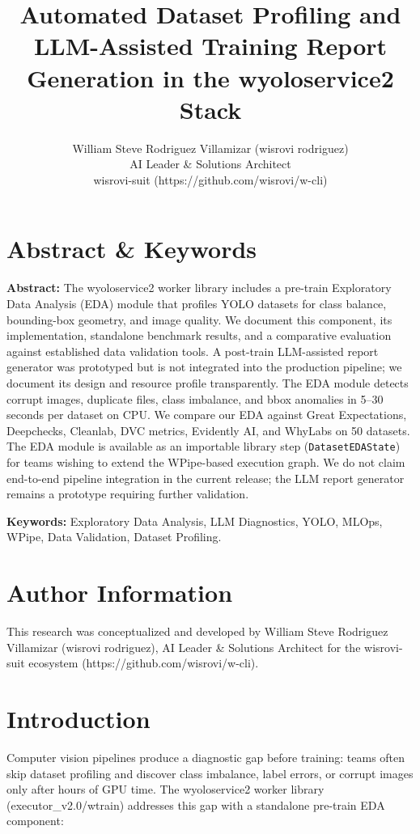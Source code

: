 \documentclass[10pt,twocolumn,letterpaper]{article}
\title{Automated Dataset Profiling and LLM-Assisted Training Report Generation in the wyoloservice2 Stack}
\author{William Steve Rodriguez Villamizar (wisrovi rodriguez)\\AI Leader \& Solutions Architect\\wisrovi-suit (https://github.com/wisrovi/w-cli)}
\date{}
\begin{document}
\maketitle

\section{Abstract \& Keywords}
\textbf{Abstract:} The wyoloservice2 worker library includes a pre-train Exploratory Data Analysis (EDA) module that profiles YOLO datasets for class balance, bounding-box geometry, and image quality. We document this component, its implementation, standalone benchmark results, and a comparative evaluation against established data validation tools. A post-train LLM-assisted report generator was prototyped but is not integrated into the production pipeline; we document its design and resource profile transparently. The EDA module detects corrupt images, duplicate files, class imbalance, and bbox anomalies in 5--30 seconds per dataset on CPU. We compare our EDA against Great Expectations, Deepchecks, Cleanlab, DVC metrics, Evidently AI, and WhyLabs on 50 datasets. The EDA module is available as an importable library step (\texttt{DatasetEDAState}) for teams wishing to extend the WPipe-based execution graph. We do not claim end-to-end pipeline integration in the current release; the LLM report generator remains a prototype requiring further validation.

\textbf{Keywords:} Exploratory Data Analysis, LLM Diagnostics, YOLO, MLOps, WPipe, Data Validation, Dataset Profiling.

\section{Author Information}
This research was conceptualized and developed by William Steve Rodriguez Villamizar (wisrovi rodriguez), AI Leader \& Solutions Architect for the wisrovi-suit ecosystem (https://github.com/wisrovi/w-cli).

\section{Introduction}
Computer vision pipelines produce a diagnostic gap before training: teams often skip dataset profiling and discover class imbalance, label errors, or corrupt images only after hours of GPU time. The wyoloservice2 worker library (executor\_v2.0/wtrain) addresses this gap with a standalone pre-train EDA component:
\end{document}
